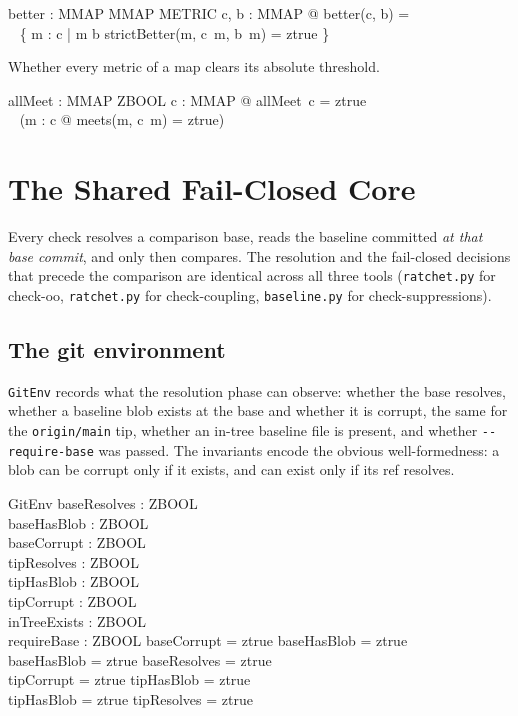\documentclass[a4paper,10pt,fleqn]{article}
\begin{document}
\begin{axdef}
better : MMAP \cross MMAP \fun \finset METRIC
\where
\forall c, b : MMAP @ better(c, b) = \\
\quad~ \{ m : \dom c | m \in \dom b \land strictBetter(m, c~m, b~m) = ztrue \}
\end{axdef}

Whether every metric of a map clears its absolute threshold.

\begin{axdef}
allMeet : MMAP \fun ZBOOL
\where
\forall c : MMAP @ allMeet~c = ztrue \iff \\
\quad~ (\forall m : \dom c @ meets(m, c~m) = ztrue)
\end{axdef}

\section{The Shared Fail-Closed Core}

Every check resolves a comparison base, reads the baseline committed
\emph{at that base commit}, and only then compares. The resolution and
the fail-closed decisions that precede the comparison are identical across
all three tools (\texttt{ratchet.py} for check-oo, \texttt{ratchet.py} for
check-coupling, \texttt{baseline.py} for check-suppressions).

\subsection{The git environment}

\texttt{GitEnv} records what the resolution phase can observe: whether the
base resolves, whether a baseline blob exists at the base and whether it is
corrupt, the same for the \texttt{origin/main} tip, whether an in-tree
baseline file is present, and whether \texttt{-{}-require-base} was passed.
The invariants encode the obvious well-formedness: a blob can be corrupt
only if it exists, and can exist only if its ref resolves.

\begin{schema}{GitEnv}
baseResolves : ZBOOL \\
baseHasBlob : ZBOOL \\
baseCorrupt : ZBOOL \\
tipResolves : ZBOOL \\
tipHasBlob : ZBOOL \\
tipCorrupt : ZBOOL \\
inTreeExists : ZBOOL \\
requireBase : ZBOOL
\where
baseCorrupt = ztrue \implies baseHasBlob = ztrue \\
baseHasBlob = ztrue \implies baseResolves = ztrue \\
tipCorrupt = ztrue \implies tipHasBlob = ztrue \\
tipHasBlob = ztrue \implies tipResolves = ztrue
\end{schema}
\end{document}
